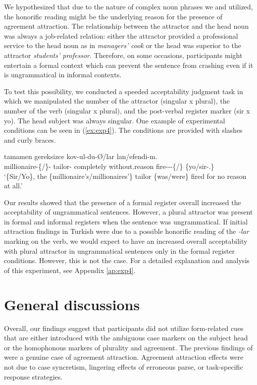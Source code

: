 We hypothesized that due to the nature of complex noun phrases we and  utilized, the honorific reading might be the underlying reason for the presence of agreement attraction. The relationship between the attractor and the head noun was always a job-related relation: either the attractor provided a professional service to the head noun as in \emph{managers' cook} or the head was superior to the attractor \emph{students' professor}. Therefore, on some occasions, participants might entertain a formal context which can prevent the sentence from crashing even if it is ungrammatical in informal contexts.

To test this possibility, we conducted a speeded acceptability judgment task in which we manipulated the number of the attractor (singular x plural), the number of the verb (singular x plural), and the post-verbal register marker (sir x yo). The head subject was always singular. One example of experimental conditions can be seen in (\ref{ex:exp4}). The conditions are provided with slashes and curly braces.

\ea \label{ex:exp4}
     tamamen gereksizce kov-ul-du-\O/lar lan/efendi-m.\\
    millionaire-\{\Sg/\Pl\}-\Gen{} tailor-\Poss{} completely without.reason fire-\Pass-\Pst-\{\Tsg{}/\Tpl{}\} \{yo/sir-\Fpl.\Poss{}\}\\
    \glt `\{Sir/Yo\}, the \{millionaire's/millionaires'\} tailor \{was/were\} fired for no reason at all.'
\z

Our results showed that the presence of a formal register overall increased the acceptability of ungrammatical sentences. However, a plural attractor was present in formal and informal registers when the sentence was ungrammatical. If initial attraction findings in Turkish were due to a possible honorific reading of the \emph{-lar} marking on the verb, we would expect to have an increased overall acceptability with plural attractor in ungrammatical sentences only in the formal register conditions. However, this is not the case. For a detailed explanation and analysis of this experiment, see Appendix \ref{ap:exp4}.

\section{General discussions}

Overall, our findings suggest that participants did not utilize form-related cues that are either introduced with the ambiguous case markers on the subject head or the homophonous markers of plurality and \Tpl{} agreement. The previous findings of  were a genuine case of agreement attraction. Agreement attraction effects were not due to case syncretism, lingering effects of erroneous parse, or task-specific response strategies. 

